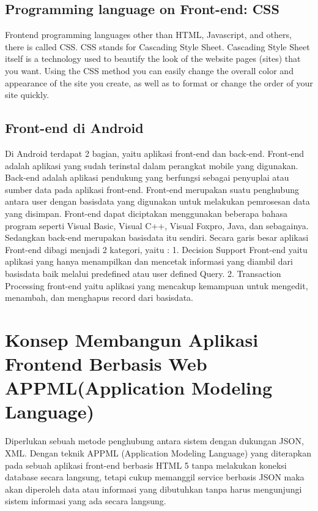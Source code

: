 \subsection{Programming language on Front-end: CSS }
Frontend programming languages other than HTML, Javascript, and others, there is called CSS. CSS stands for Cascading Style Sheet. Cascading Style Sheet itself is a technology used to beautify 
the look of the website pages (sites) that you want. Using the CSS method you can easily change the overall color and appearance of the site you create, as well as to format or change the order of your site quickly.\cite{poetra2003tutorial}
\subsection{Front-end di Android}
Di Android terdapat 2 bagian, yaitu aplikasi front-end dan back-end. Front-end adalah aplikasi yang sudah terinstal dalam perangkat mobile yang digunakan.
Back-end adalah aplikasi pendukung yang berfungsi sebagai penyuplai atau sumber data pada aplikasi front-end. Front-end merupakan suatu penghubung
antara user dengan basisdata yang digunakan untuk melakukan pemrosesan data yang disimpan. Front-end dapat diciptakan menggunakan 
beberapa bahasa program seperti Visual Basic, Visual C++, Visual Foxpro, Java, dan sebagainya. Sedangkan back-end merupakan basisdata itu sendiri.
 Secara garis besar aplikasi Front-end dibagi menjadi 2 kategori, yaitu :
1. Decision Support Front-end yaitu aplikasi yang hanya menampilkan  dan mencetak informasi yang diambil dari basisdata baik melalui predefined atau user defined Query.
2. Transaction Processing front-end yaitu aplikasi yang mencakup kemampuan untuk mengedit, menambah, dan menghapus record dari basisdata.\cite{nuari2014perancangan}
\section{Konsep Membangun Aplikasi Frontend Berbasis Web APPML(Application Modeling Language) }
Diperlukan sebuah metode penghubung antara sistem dengan dukungan JSON, XML. Dengan teknik APPML (Application Modeling Language) yang diterapkan pada sebuah aplikasi front-end berbasis HTML 5 tanpa melakukan koneksi database secara langsung, tetapi cukup memanggil service berbasis JSON maka akan diperoleh data atau informasi yang dibutuhkan tanpa harus mengunjungi sistem informasi yang ada secara langsung.\cite{triyono2017konsep}

